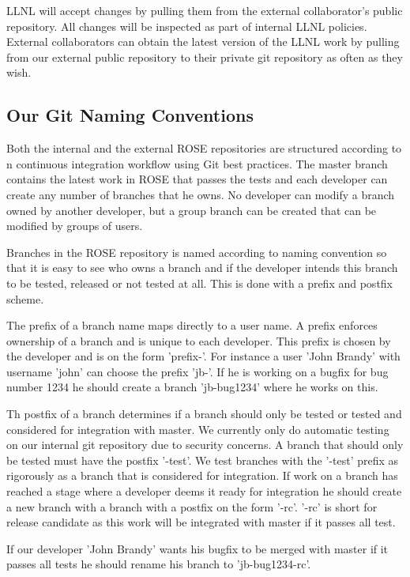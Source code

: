 LLNL will accept changes by pulling them from the external collaborator's
public repository.  All changes will be inspected as part of internal 
LLNL policies. External collaborators can obtain the latest version of
the LLNL work by pulling from our external public repository to their
private git repository as often as they wish.



\subsection{Our Git Naming Conventions}

Both the internal and the external ROSE repositories are structured according to
n continuous integration workflow using Git best practices. The master branch
contains the latest work in ROSE that passes the tests and each developer can
create any number of branches that he owns. No developer can modify
a branch owned by another developer, but a group branch can be created that 
can be modified by groups of users. 

Branches in the ROSE repository is named according to naming convention so that 
it is easy to see who owns a branch and if the developer intends this branch to
be tested, released or not tested at all. This is done with a prefix and postfix
scheme.

The prefix of a branch name maps directly to a user name. A prefix enforces 
ownership of a branch and is unique to each developer. This prefix is chosen
by the developer and is on the form 'prefix-'. For instance a user 'John Brandy' 
with username 'john' can choose the prefix 'jb-'. If he is working on a bugfix
for bug number 1234 he should create a branch 'jb-bug1234' where he works on this.

Th postfix of a branch determines if a branch should only be tested or tested and
considered for integration with master. We currently only do automatic testing on
our internal git repository due to security concerns. A branch that should only be 
tested must have the postfix '-test'. We test branches with the '-test' prefix as 
rigorously as a branch that is considered for integration. If work on a branch has
reached a stage where a developer deems it ready for integration he should create
a new branch with a branch with a postfix on the form '-rc'. '-rc' is short for
release candidate as this work will be integrated with master if it passes all test.

If our developer 'John Brandy' wants his bugfix to be merged with master if it passes
all tests he should rename his branch to 'jb-bug1234-rc'.


